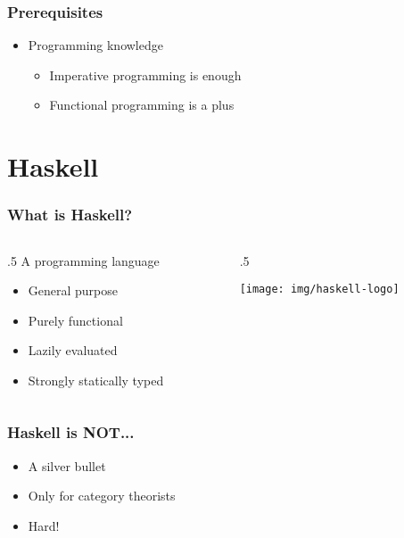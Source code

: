\documentclass[17pt]{beamer}
\renewcommand{\(}[1]{\begin{columns}[#1]}
\renewcommand{\)}{\end{columns}}
\newcommand{\<}[1]{\begin{column}{#1}}
\renewcommand{\>}{\end{column}}
\begin{document}
\begin{frame}
  \frametitle{Prerequisites}
  \begin{center}
    \begin{itemize}
      \item Programming knowledge
        \begin{itemize}
          \item Imperative programming is enough
          \item Functional programming is a plus
        \end{itemize}
    \end{itemize}
  \end{center}
\end{frame}


\section{Haskell}

\begin{frame}
  \frametitle{What is Haskell?}
  \({c}
  \<{.5\textwidth}
  A programming language
  \begin{center}
    \begin{itemize}[<+->]
    \item General purpose
    \item Purely functional
    \item Lazily evaluated
    \item Strongly statically typed
    \end{itemize}
  \end{center}
  \>
  \<{.5\textwidth}
  \begin{center}
    \texttt{[image: img/haskell-logo]}
  \end{center}
  \>
  \)
\end{frame}

\begin{frame}
  \frametitle{Haskell is NOT...}
  \begin{center}
    \begin{itemize}
    \item A silver bullet
    \item Only for category theorists
    \item<2-> Hard! 
    \end{itemize}
  \end{center}
\end{frame}
\end{document}
